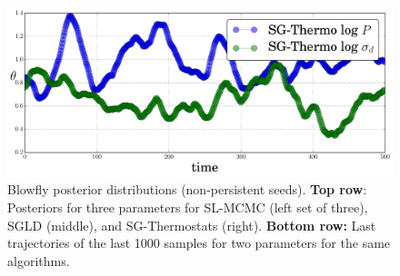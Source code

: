 \documentclass[]{article}
\begin{document}
\begin{figure}[ht!]
\begin{center}
    \includegraphics[width=0.65\columnwidth]{./images/blowfly/non-sticky-theta-1d-SG-Thermo.pdf}
   \vspace{-0.1in}
   \caption{\small{Blowfly posterior distributions (non-persistent seeds).  {\bf Top row}:  Posteriors for three parameters for SL-MCMC (left set of three), SGLD (middle), and SG-Thermostats (right).  {\bf Bottom row:} Last trajectories of the last 1000 samples for two parameters for the same algorithms.
  }}
  \label{fig:bf-results}
  \end{center}
  \vskip -0.2in
  \end{figure}
  

%
\end{document}
